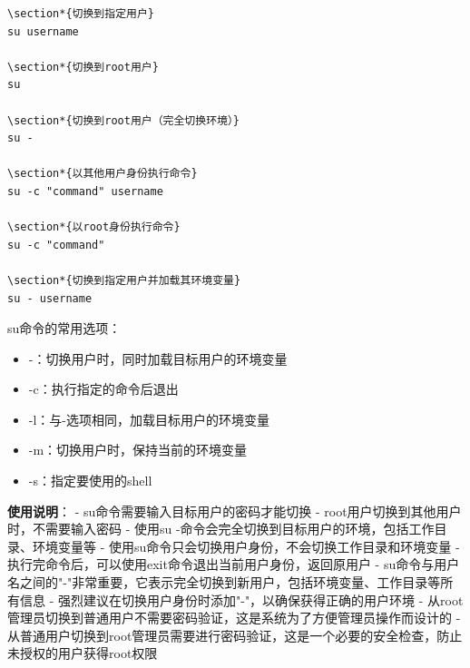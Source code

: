 \documentclass[12pt,UTF8]{ctexbook}
\begin{document}
\begin{verbatim}
\section*{切换到指定用户}
su username

\section*{切换到root用户}
su

\section*{切换到root用户（完全切换环境）}
su -

\section*{以其他用户身份执行命令}
su -c "command" username

\section*{以root身份执行命令}
su -c "command"

\section*{切换到指定用户并加载其环境变量}
su - username
\end{verbatim}

su命令的常用选项：
\begin{itemize}
    \item -：切换用户时，同时加载目标用户的环境变量
    \item -c：执行指定的命令后退出
    \item -l：与-选项相同，加载目标用户的环境变量
    \item -m：切换用户时，保持当前的环境变量
    \item -s：指定要使用的shell
\end{itemize}

\textbf{使用说明}：
- su命令需要输入目标用户的密码才能切换
- root用户切换到其他用户时，不需要输入密码
- 使用su -命令会完全切换到目标用户的环境，包括工作目录、环境变量等
- 使用su命令只会切换用户身份，不会切换工作目录和环境变量
- 执行完命令后，可以使用exit命令退出当前用户身份，返回原用户
- su命令与用户名之间的"-"非常重要，它表示完全切换到新用户，包括环境变量、工作目录等所有信息
- 强烈建议在切换用户身份时添加"-"，以确保获得正确的用户环境
- 从root管理员切换到普通用户不需要密码验证，这是系统为了方便管理员操作而设计的
- 从普通用户切换到root管理员需要进行密码验证，这是一个必要的安全检查，防止未授权的用户获得root权限
\end{document}
